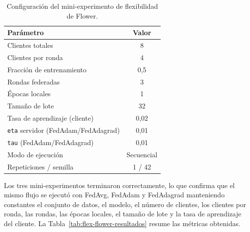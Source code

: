 \begin{table}[htbp]
  \centering
  \caption{Configuración del mini-experimento de flexibilidad de Flower.}
  \label{tab:flex-flower-config}
  \begin{tabular}{lc}
    \toprule
    \textbf{Parámetro} & \textbf{Valor} \\
    \midrule
    Clientes totales & 8 \\
    Clientes por ronda & 4 \\
    Fracción de entrenamiento & 0,5 \\
    Rondas federadas & 3 \\
    Épocas locales & 1 \\
    Tamaño de lote & 32 \\
    Tasa de aprendizaje (cliente) & 0,02 \\
    \texttt{eta} servidor (FedAdam/FedAdagrad) & 0,01 \\
    \texttt{tau} (FedAdam/FedAdagrad) & 0,01 \\
    Modo de ejecución & Secuencial \\
    Repeticiones / semilla & 1 / 42 \\
    \bottomrule
  \end{tabular}
\end{table}

Los tres mini-experimentos terminaron correctamente, lo que confirma que el mismo
flujo se ejecutó con FedAvg, FedAdam y FedAdagrad manteniendo constantes el
conjunto de datos, el modelo, el número de clientes, los clientes por ronda, las
rondas, las épocas locales, el tamaño de lote y la tasa de aprendizaje del
cliente. La Tabla~\ref{tab:flex-flower-resultados} resume las métricas obtenidas.

\begin{table}[htbp]
  \centering
  \footnotesize
  \setlength{\tabcolsep}{4pt}
  \caption{Resultados del mini-experimento de flexibilidad de Flower con tres
  estrategias de agregación. Las cifras son auxiliares y no deben interpretarse
  como una comparación de rendimiento. Se reportan dos medidas de memoria de GPU:
  la registrada por \texttt{nvidia-smi} a nivel de sistema (\textit{GPU sist.}),
  afectada por otras aplicaciones del equipo, y el pico reservado por PyTorch al
  proceso del cliente (\textit{GPU proc.}), métrica comparable entre estrategias.}
  \label{tab:flex-flower-resultados}
\end{table}

